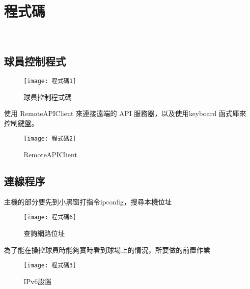 \chapter{程式碼}\

\section{球員控制程式}
 
 \begin{figure}[hbt!]
\begin{center}
\texttt{[image: 程式碼1]}
\caption{\Large 球員控制程式碼}\label{fig.程式碼1}
\end{center}
\end{figure}

\begin{center}
 使用 RemoteAPIClient 來連接遠端的 API 服務器，以及使用keyboard 函式庫來控制鍵盤。\\
 \end{center}
 
\begin{figure}[hbt!]
\begin{center}
\texttt{[image: 程式碼2]}
\caption{\Large RemoteAPIClient}\label{fig.程式碼2}
\end{center}
\end{figure}

\newpage
 
\section{連線程序}

\begin{center}
主機的部分要先到小黑窗打指令ipconfig，搜尋本機位址
\end{center}

\begin{figure}[hbt!]
\begin{center}
\texttt{[image: 程式碼6]}
\caption{\Large 查詢網路位址}\label{fig.程式碼6}
\end{center}
\end{figure}

\begin{center}
為了能在操控球員時能夠實時看到球場上的情況，所要做的前置作業
\end{center}

\begin{figure}[hbt!]
\begin{center}
\texttt{[image: 程式碼3]}
\caption{\Large IPv6設置}\label{fig.程式碼3}
\end{center}
\end{figure}
\newpage


